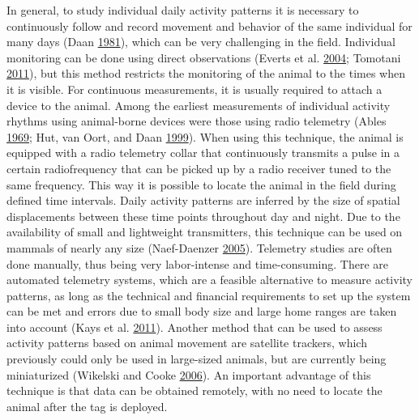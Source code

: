 \documentclass[msc,numbers,hidelinks]{coppe}
\begin{document}
  In general, to study individual daily activity patterns it is necessary to continuously follow and record movement and behavior of the same individual for many days (Daan \protect\hyperlink{ref-daanAdaptiveDailyStrategies1981}{1981}), which can be very challenging in the field. Individual monitoring can be done using direct observations (Everts et al. \protect\hyperlink{ref-evertsSeasonalVariationDaily2004}{2004}; Tomotani \protect\hyperlink{ref-tomotaniPosefeitosSincronizacaoEm2011}{2011}), but this method restricts the monitoring of the animal to the times when it is visible. For continuous measurements, it is usually required to attach a device to the animal. Among the earliest measurements of individual activity rhythms using animal-borne devices were those using radio telemetry (Ables \protect\hyperlink{ref-ablesActivityStudiesRed1969}{1969}; Hut, van Oort, and Daan \protect\hyperlink{ref-hutNaturalEntrainmentDawn1999}{1999}). When using this technique, the animal is equipped with a radio telemetry collar that continuously transmits a pulse in a certain radiofrequency that can be picked up by a radio receiver tuned to the same frequency. This way it is possible to locate the animal in the field during defined time intervals. Daily activity patterns are inferred by the size of spatial displacements between these time points throughout day and night. Due to the availability of small and lightweight transmitters, this technique can be used on mammals of nearly any size (Naef-Daenzer \protect\hyperlink{ref-naef-daenzerMiniaturizationEvaluationAttachment2005}{2005}). Telemetry studies are often done manually, thus being very labor-intense and time-consuming. There are automated telemetry systems, which are a feasible alternative to measure activity patterns, as long as the technical and financial requirements to set up the system can be met and errors due to small body size and large home ranges are taken into account (Kays et al. \protect\hyperlink{ref-kaysTrackingAnimalLocation2011}{2011}). Another method that can be used to assess activity patterns based on animal movement are satellite trackers, which previously could only be used in large-sized animals, but are currently being miniaturized (Wikelski and Cooke \protect\hyperlink{ref-wikelskiConservationPhysiology2006}{2006}). An important advantage of this technique is that data can be obtained remotely, with no need to locate the animal after the tag is deployed.
\end{document}
